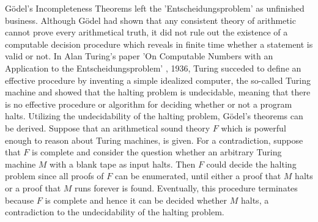 G\"odel's Incompleteness Theorems left the 'Entscheidungsproblem' as unfinished business. Although G\"odel had shown that any consistent theory of arithmetic cannot prove every arithmetical truth, it did not rule out the existence of a computable decision procedure which reveals in finite time whether a statement is valid or not. In Alan Turing's paper 'On Computable Numbers with an Application to the Entscheidungsproblem' \cite{Church1937}, 1936, Turing succeded to define an effective procedure by inventing a simple idealized computer, the so-called Turing machine and showed that the halting problem is undecidable, meaning that there is no effective procedure or algorithm for deciding whether or not a program halts. Utilizing the undecidability of the halting problem, G\"odel's theorems can be derived. Suppose that an arithmetical sound theory $F$ which is powerful enough to reason about Turing machines, is given. For a contradiction, suppose that $F$ is complete and consider the question whether an arbitrary Turing machine $M$ with a blank tape as input halts. Then $F$ could decide the halting problem since all proofs of $F$ can be enumerated, until either a proof that $M$ halts or a proof that $M$ runs forever is found.  Eventually, this procedure terminates because $F$ is complete and hence it can be decided whether $M$ halts, a contradiction to the undecidability of the halting problem.

